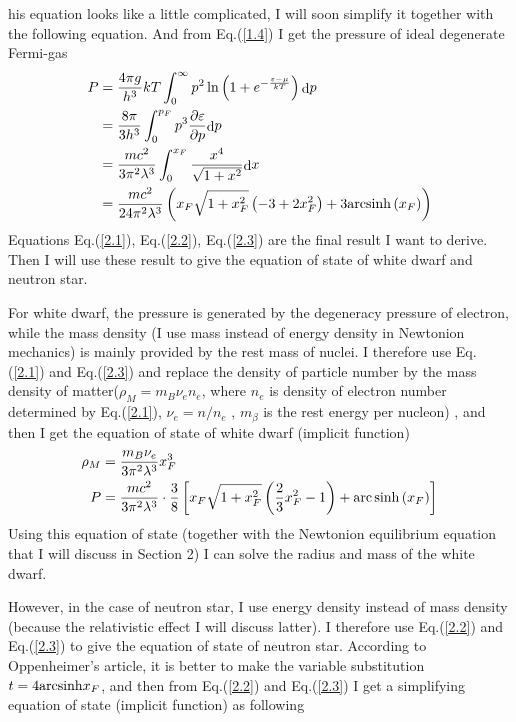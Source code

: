 \documentclass[reprint]{revtex4-1}
\begin{document}
his equation looks like a little complicated, I will soon simplify it together with the following equation. And from Eq.(\ref{1.4}) I get the pressure of ideal degenerate Fermi-gas
\begin{align}
	 P &= {{4\pi g} \over {{h^3}}}kT\int_0^\infty  {{p^2}\ln \left( {1 + {e^{ - {{\varepsilon  - \mu } \over {kT}}}}} \right){\mathop{\rm d}\nolimits} p}  \nonumber \\ 
	& = {{8\pi } \over {3{h^3}}}\int_0^{{p_F}} {{p^3}{{\partial \varepsilon } \over {\partial p}}{\mathop{\rm d}\nolimits} p}    
	 {\rm{       }} \nonumber \\ 
	& = {{m{c^2}} \over {3{\pi ^2}{\lambda ^3}}}\int_0^{{x_F}} {{{{x^4}} \over {\sqrt {1 + {x^2}} }}} {\mathop{\rm d}\nolimits} x \nonumber \\ 
	& = {{m{c^2}} \over {24{\pi ^2}{\lambda ^3}}}\left( {x_F\sqrt {1 + x_F^2} \left( { - 3 + 2x_F^2} \right) + 3{\mathop{\rm arcsinh}\nolimits} \left( {{x_F}} \right)} \right)  \label{2.3}
\end{align}
Equations Eq.(\ref{2.1}), Eq.(\ref{2.2}), Eq.(\ref{2.3}) are the final result I want to derive. Then I will use these result to give the equation of state of white dwarf and neutron star.\par
For white dwarf, the pressure is generated by the degeneracy pressure of electron, while the mass density (I use mass instead of energy density in Newtonion mechanics) is mainly provided by the rest mass of nuclei. I therefore use Eq.(\ref{2.1})  and Eq.(\ref{2.3}) and replace the density of particle number by the mass density of matter(${\rho _M} = {m_B}{\nu _e}{n_e}$, where $n_e$ is density of electron number determined by Eq.(\ref{2.1}), ${\nu _e} = n/{n_e}$ , $m_\beta$   is the rest energy per nucleon)
, and then I get the equation of state of white dwarf (implicit function)
\begin{align}
{\rho _M} &= {{{m_B}{\nu _e}} \over {3{\pi ^2}{\lambda ^3}}}x_F^3 \nonumber \\
P &= {{m{c^2}} \over {3{\pi ^2}{\lambda ^3}}} \cdot {3 \over 8}\left[ {{x_F}\sqrt {1 + x_F^2} \left( {{2 \over 3}x_F^2 - 1} \right) + {\mathop{\rm arc}\nolimits} \sinh \left( {{x_F}} \right)} \right] \label{2.4}
\end{align}
Using this equation of state (together with the Newtonion equilibrium equation that I will discuss in Section 2) I can solve the radius and mass of the white dwarf.\par
However, in the case of neutron star, I use energy density instead of mass density (because the relativistic effect I will discuss latter). I therefore use Eq.(\ref{2.2}) and Eq.(\ref{2.3}) to give the equation of state of neutron star. According to Oppenheimer’s article, it is better to make the variable substitution $t = 4{\mathop{\rm arcsinh}\nolimits} {x_F}$, and then from Eq.(\ref{2.2}) and Eq.(\ref{2.3}) I get a simplifying equation of state (implicit function) as following
\end{document}
